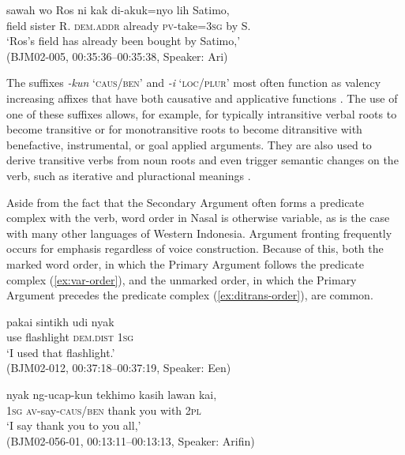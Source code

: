 \documentclass[output=paper,colorlinks,citecolor=brown
\ChapterDOI{10.5281/zenodo.15697585}
]{langscibook}
\begin{document}
\begin{exe}
    \ex\label{ex:nsy-pv} \gll
        sawah wo Ros ni kak di-akuk=nyo lih Satimo, \\
        field sister R. \textsc{dem.addr} already \textsc{pv}-take=3\textsc{sg} by S. \\
        \glt `Ros's field has already been bought by Satimo,' \\
    \hfill (BJM02-005, 00:35:36–00:35:38, Speaker: Ari) 
\end{exe}

The suffixes \textit{-kun} `\textsc{caus/ben}' and \textit{-i} `\textsc{loc/plur}' most often function as valency increasing affixes that have both causative and applicative functions \citep[see][]{mcdonnell2024applicative}. The use of one of these suffixes allows, for example, for typically intransitive verbal roots to become transitive or for monotransitive roots to become ditransitive with benefactive, instrumental, or goal applied arguments. They are also used to derive transitive verbs from noun roots and even trigger semantic changes on the verb, such as iterative and pluractional meanings \citep[see][]{truong2022neglected}. 

Aside from the fact that the Secondary Argument often forms a predicate complex with the verb, word order in Nasal is otherwise variable, as is the case with many other languages of Western Indonesia. Argument fronting frequently occurs for emphasis regardless of voice construction. Because of this, both the marked word order, in which the Primary Argument follows the predicate complex (\ref{ex:var-order}), and the unmarked order, in which the Primary Argument precedes the predicate complex (\ref{ex:ditrans-order}), are common.

\begin{exe}
    \ex\label{ex:var-order} \gll
        pakai sintikh udi nyak \\
        use flashlight \textsc{dem.dist} 1\textsc{sg} \\
        \glt `I used that flashlight.' \\
    \hfill (BJM02-012, 00:37:18–00:37:19, Speaker: Een) 
\end{exe}

\begin{exe}
    \ex\label{ex:ditrans-order} \gll
        nyak ng-ucap-kun {tekhimo kasih} lawan kai, \\
        1\textsc{sg} \textsc{av}-say-\textsc{caus/ben} {thank you} with 2\textsc{pl} \\
        \glt `I say thank you to you all,' \\
    \hfill (BJM02-056-01, 00:13:11–00:13:13, Speaker: Arifin) 
\end{exe}
\end{document}
